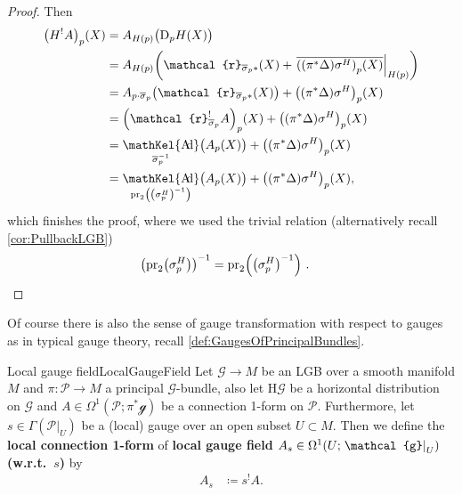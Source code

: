 \documentclass[reqno,a4paper,oneside]{amsart}
\theoremstyle{plain}
\theoremstyle{remark}
\theoremstyle{definition}
\def\bas#1\eas{\begin{align*}#1\end{align*}}
\DeclareMathOperator{\sAd}{\mathKel{A\mkern-5.5mu d}}
\begin{document}
\begin{proof}
Then
\begin{align*}
\mleft(H^!A\mright)_p(X)
&=
A_{H(p)}\bigl( \mathrm{D}_pH(X) \bigr)
\\
&=
A_{H(p)}\mleft( 
	\mathcal{r}_{\overline{\sigma}_p*}(X)
	+ \mleft.{\overline{ \mleft(\mleft(\pi^*\Delta\mright)\sigma^H\mright)_p(X) }}\mright|_{H(p)}
\mright)
\\
&=
A_{p \cdot \overline{\sigma}_p}\mleft( 
	\mathcal{r}_{\overline{\sigma}_p*}(X)
\mright)
	+ \mleft(\mleft(\pi^*\Delta\mright)\sigma^H\mright)_p(X)
\\
&=
\mleft(\mathcal{r}_{\overline{\sigma}_p}^!A\mright)_p(X)
	+ \mleft(\mleft(\pi^*\Delta\mright)\sigma^H\mright)_p(X)
\\
&=
\sAd_{\overline{\sigma}_p^{-1}}\bigl(A_p(X)\bigr)
	+ \mleft(\mleft(\pi^*\Delta\mright)\sigma^H\mright)_p(X)
\\
&=
\sAd_{\mathrm{pr}_2\mleft( \mleft(\sigma_p^H\mright)^{-1} \mright)}\bigl(A_p(X)\bigr)
	+ \mleft(\mleft(\pi^*\Delta\mright)\sigma^H\mright)_p(X),
\end{align*}
which finishes the proof, where we used the trivial relation (alternatively recall \ref{cor:PullbackLGB})
\begin{align*}
\mleft(\mathrm{pr}_2\mleft( \sigma_p^H \mright)\mright)^{-1}
&=
\mathrm{pr}_2\mleft( \mleft(\sigma_p^H\mright)^{-1} \mright)~.
\end{align*}
\end{proof}

Of course there is also the sense of gauge transformation with respect to gauges as in typical gauge theory, recall \ref{def:GaugesOfPrincipalBundles}.

\begin{definitions}{Local gauge field}{LocalGaugeField}
Let $\mathcal{G} \to M$ be an LGB over a smooth manifold $M$ and $\pi\colon\mathcal{P} \to M$ a principal $\mathcal{G}$-bundle, also let $\mathrm{H}\mathcal{G}$ be a horizontal distribution on $\mathcal{G}$ and $A \in \Omega^1(\mathcal{P}; \pi^*\mathcal{g})$ be a connection 1-form on $\mathcal{P}$. Furthermore, let $s \in \Gamma(\mathcal{P}|_U)$ be a (local) gauge over an open subset $U \subset M$. Then we define the \textbf{local connection 1-form} of \textbf{local gauge field $A_s \in \Omega^1\mleft(U; \mleft.\mathcal{g}\mright|_U\mright)$ (w.r.t.\ $s$)} by
\begin{align*}
A_s
&\coloneqq
s^!A.
\end{align*}
\end{definitions}
\end{document}
